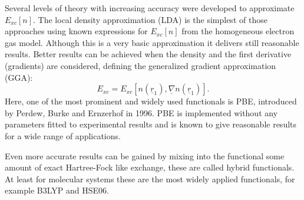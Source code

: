 \documentclass[11pt,DIV=13,BCOR=5mm,a4paper,headinclude]{scrbook}
\renewcommand{\vec}[1]{\underline{#1}}
\begin{document}
Several levels of theory with increasing accuracy were developed to approximate $E_{xc}[n]$.
The local density approximation (LDA) is the simplest of those approaches using known expressions for $E_{xc}[n]$ from the homogeneous electron gas model.
Although this is a very basic approximation it delivers still reasonable results.
Better results can be achieved when the density and the first derivative (gradients) are considered, defining the generalized gradient approximation (GGA):
\begin{equation}
  E_{xc}=E_{xc}[n(\vec{r}_1),\vec{\nabla} n(\vec{r}_1)].
\end{equation}
Here, one of the most prominent and widely used functionals is PBE, introduced by Perdew, Burke and Ernzerhof in 1996\cite{Perdew96a,erratum}.
PBE is implemented without any parameters fitted to experimental results and is known to give reasonable results for a wide range of applications.


Even more accurate results can be gained by mixing into the functional some amount of exact Hartree-Fock like exchange, these are called hybrid functionals.
At least for molecular systems these are the most widely applied functionals, for example B3LYP\cite{B3LYP1,B3LYP2} and HSE06\cite{HSE06}.
\end{document}
